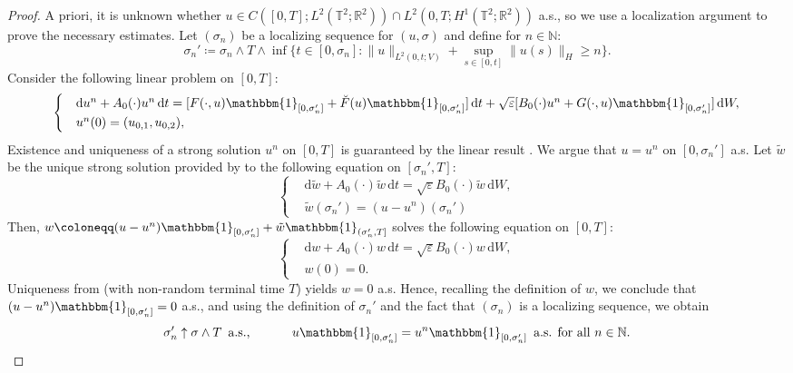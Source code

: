\documentclass{amsart}
\newcommand{\dd}{\,\mathrm{d}}
\newcommand{\ddd}{\mathrm{d}}
\newcommand{\one}{\mathbbm{1}}
\newcommand{\<}{\langle}
\newcommand{\?}{\rangle}
\newcommand{\ceqq}{\coloneqq}
\newcommand{\Tor}{\mathbb{T}}
\renewcommand{\Tor}{\mathbb{T}^2}
\theoremstyle{plain}
\theoremstyle{remark}
\theoremstyle{plain}
\numberwithin{equation}{section}
\def\N{{\mathbb N}}
\def\R{{\mathbb R}}
\newcommand{\eps}{\varepsilon}
\begin{document}
\begin{proof}
A priori, it is unknown whether $u\in C([0,T];L^2(\Tor;\R^2))\cap L^2(0,T;H^1(\Tor;\R^2))$ a.s., so we use a localization argument to prove the necessary estimates. 
Let $(\sigma_n)$ be a localizing sequence for $(u,\sigma)$ and define for $n\in\N$: 
\[ 
\sigma_n'\ceqq \sigma_n \wedge T\wedge\inf\{t\in[0,\sigma_n]:\|u\|_{L^2(0,t;V)}+\sup_{s\in[0,t]}\|u(s)\|_H\geq n\}. 
\]  
Consider the following linear problem on $[0,T]$:
\begin{equation}\label{eq:brusselator lin ext}
     \begin{cases} 
    &\ddd u^n +A_0(\cdot)u^n  \dd t=[F(\cdot,u)\one_{[0,\sigma_n']}+\breve{F}(u)\one_{[0,\sigma_n']}]\dd t +\sqrt{\eps}[B_0(\cdot)u^n +G(\cdot,u)\one_{[0,\sigma_n']}]\dd W,   \\ 
   &u^n(0)=(u_{0,1},u_{0,2}),
\end{cases} 
\end{equation} 
Existence and uniqueness of a strong solution $u^n$ on $[0,T]$ is guaranteed by the linear result \cite[Th.\ 4.6]{BGV}. We argue that $u=u^n$ on $[0,\sigma_n']$ a.s. 
Let $\tilde w$ be the unique strong solution provided by \cite[Th.\ 4.6]{BGV} to the following equation on $[\sigma_n',T]$:
\[
     \begin{cases} 
    &\ddd \tilde w +A_0(\cdot)\tilde w  \dd t= \sqrt{\eps} B_0(\cdot)\tilde w \dd W,   \\ 
   &\tilde w(\sigma_n')=(u-u^n)(\sigma_n') 
\end{cases} 
\]
Then, $w\ceqq (u-u^n)\one_{[0,\sigma_n']}+\tilde w\one_{(\sigma_n',T]}$ solves the following equation on $[0,T]$:
\[
     \begin{cases} 
    &\ddd w +A_0(\cdot)w  \dd t= \sqrt{\eps} B_0(\cdot)w \dd W,   \\ 
   &w(0)=0.
\end{cases} 
\]
Uniqueness from \cite[Th.\ 4.6]{BGV} (with non-random terminal time $T$) yields $w=0$ a.s. Hence, recalling the definition of $w$, we conclude that  $(u-u^n)\one_{[0,\sigma_n']}=0$ a.s., and using the definition of $\sigma_n'$ and the fact that $(\sigma_n)$ is a localizing sequence, we obtain 
\begin{equation}\label{eq:lim u^n}
 \sigma_n'\uparrow\sigma\wedge T \, \text{ a.s.,  }\qquad\quad u\one_{[0,\sigma_n']}=u^n\one_{[0,\sigma_n']}\, \text{ a.s. for all  }n\in\N. 
\end{equation}


\end{proof}
\end{document}
